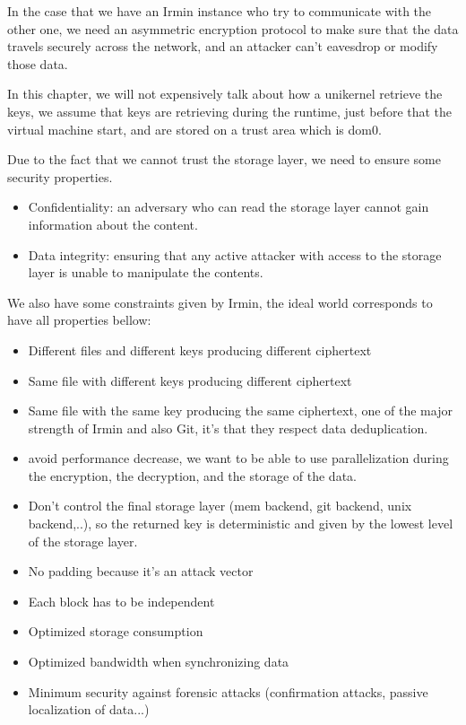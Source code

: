 \documentclass[10pt,a4paper]{report}
\begin{document}
In the case that we have an Irmin instance who try to communicate with the other one, we need an asymmetric encryption protocol to make sure that the data travels securely across the network, and an attacker can't eavesdrop or modify those data.\newline

In this chapter, we will not expensively talk about how a unikernel retrieve the keys, we assume that keys are retrieving during the runtime, just before that the virtual machine start, and are stored on a trust area which is dom0.\newline

Due to the fact that we cannot trust the storage layer, we need to ensure some security properties.  
\begin{itemize}
\item Confidentiality: an adversary who can read the storage layer cannot gain information about the content.
\item Data integrity: ensuring that any active attacker with access to the storage layer is unable to manipulate the contents.
\end{itemize} 

We also have some constraints given by Irmin, the ideal world corresponds to have all properties bellow:\newline

\begin{itemize}
\item  Different files and different keys producing different ciphertext
\item Same file with different keys producing different ciphertext
\item  Same file with the same key producing the same ciphertext, one of the major strength of Irmin and also Git, it's that they respect data deduplication. 
\item avoid performance decrease, we want to be able to use parallelization during the encryption, the decryption, and the storage of the data.
\item Don't control the final storage layer (mem backend, git backend, unix backend,..), so the returned key is deterministic and given by the lowest level of the storage layer. 
\item No padding because it's an attack vector
\item Each block has to be independent
\item Optimized storage consumption
\item Optimized bandwidth when synchronizing data
\item Minimum security against forensic attacks (confirmation attacks, passive localization of data...)
\end{itemize}
\end{document}
